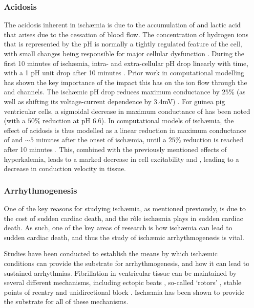 \documentclass[../thesis-main.tex]{subfiles}
\begin{document}
 \subsubsection{Acidosis}
 \label{subsubsec:acidosis}
 The acidosis inherent in isch\ae mia is due to the accumulation of  and lactic acid that arises due to the cessation of blood flow. The concentration of hydrogen ions that is represented by the pH is normally a tightly regulated feature of the cell, with small changes being responsible for major cellular dysfunction \citep{Chen1998}. During the first 10 minutes of isch\ae mia, intra- and extra-cellular pH drop linearly with time, with a 1 pH unit drop after 10 minutes \citep{Shaw1997}. Prior work in computational modelling has shown the key importance of the impact this has on the ion flow through the \ina{} and \ica{} channels. The isch\ae mic pH drop reduces \ina{} maximum conductance by $25\%$ (as well as shifting its voltage-current dependence by 3.4mV) \citep{Kagiyama1982}. For guinea pig ventricular cells, a sigmoidal decrease in maximum conductance of \ica{} has been noted (with a $50\%$ reduction at pH 6.6). In computational models of isch\ae mia, the effect of acidosis is thus modelled as a linear reduction in maximum conductance of \ina{} and \ica{} $\sim5$ minutes after the onset of isch\ae mia, until a $25\%$ reduction is reached after 10 minutes \citep{Trenor2007}. This, combined with the previously mentioned effects of hyperkalemia, leads to a marked decrease in cell excitability and \dvdt{}, leading to a decrease in conduction velocity in tissue.
 
 
 \subsubsection{Arrhythmogenesis}
 \label{subsubsec:arrhythmogenesis}
 One of the key reasons for studying isch\ae mia, as mentioned previously, is due to the cost of sudden cardiac death, and the r\^ole isch\ae mia plays in sudden cardiac death. As such, one of the key areas of research is how isch\ae mia can lead to sudden cardiac death, and thus the study of isch\ae mic arrhythmogenesis is vital.
 
 Studies have been conducted to establish the means by which isch\ae mic conditions can provide the substrate for arrhythmogenesis, and how it can lead to sustained arrhythmias. Fibrillation in ventricular tissue can be maintained by several different mechanisms, including ectopic beats \citep{Haissaguerre1998, Tobon2010, Zhang2011}, so-called `rotors' \citep{Jalife2003}, stable points of reentry \citep{Mandapati2000, Allessie1977} and unidirectional block \citep{Allessie1976, Gough1985}. Isch\ae mia has been shown to provide the substrate for all of these mechanisms.
 
\end{document}
